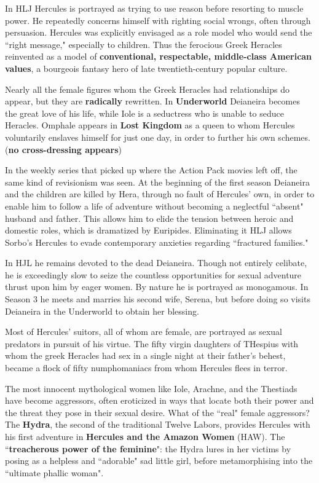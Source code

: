 In HLJ Hercules is portrayed as trying to use reason before resorting to muscle power. He repeatedly concerns himself with righting social wrongs, often through persuasion. Hercules was explicitly envisaged as a role model who would send the ``right message," especially to children. Thus the ferocious Greek Heracles reinvented as a model of \textbf{conventional, respectable, middle-class American values}, a bourgeois fantasy hero of late twentieth-century popular culture.

Nearly all the female figures whom the Greek Heracles had relationships do appear, but they are \textbf{radically} rewritten. In \textbf{Underworld} Deianeira becomes the great love of his life, while Iole is a seductress who is unable to seduce Heracles. Omphale appears in \textbf{Lost Kingdom} as a queen to whom Hercules voluntarily enslaves himself for just one day, in order to further his own schemes. (\textbf{no cross-dressing appears})


In the weekly series that picked up where the Action Pack movies left off, the same kind of revisionism was seen. At the beginning of the first season Deianeira and the children are killed by Hera, through no fault of Hercules' own, in order to enable him to follow a life of adventure without becoming a neglectful ``absent" husband and father. This allows him to elide the tension between heroic and domestic roles, which is dramatized by Euripides. Eliminating it HLJ allows Sorbo's Hercules to evade contemporary anxieties regarding ``fractured families."

In HJL he remains devoted to the dead Deianeira. Though not entirely celibate, he is exceedingly slow to seize the countless opportunities for sexual adventure thrust upon him by eager women. By nature he is portrayed as monogamous. In Season 3 he meets and marries his second wife, Serena, but before doing so visits Deianeira in the Underworld to obtain her blessing.

\begin{rmk}
    Most of Hercules' suitors, all of whom are female, are portrayed as sexual predators in pursuit of his virtue. The fifty virgin daughters of THespius with whom the greek Heracles had sex in a single night at their father's behest, became a flock of fifty numphomaniacs from whom Hercules flees in terror.
\end{rmk}

The most innocent mythological women like Iole, Arachne, and the Thestiads have become aggressors, often eroticized in ways that locate both their power and the threat they pose in their sexual desire. What of the ``real" female aggressors? The \textbf{Hydra}, the second of the traditional Twelve Labors, provides Hercules with his first adventure in \textbf{Hercules and the Amazon Women} (HAW). The ``\textbf{treacherous power of the feminine}": the Hydra lures in her victims by posing as a helpless and ``adorable" sad little girl, before metamorphising into the ``ultimate phallic woman".

